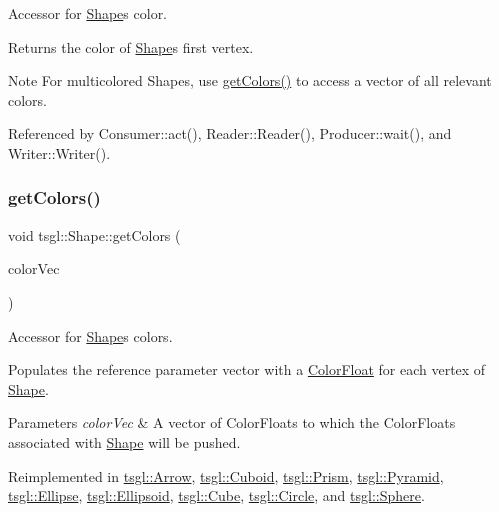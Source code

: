 Accessor for \hyperlink{classtsgl_1_1_shape}{Shape}\textquotesingle{}s color. 

Returns the color of \hyperlink{classtsgl_1_1_shape}{Shape}\textquotesingle{}s first vertex. \begin{DoxyNote}{Note}
For multicolored Shapes, use \hyperlink{classtsgl_1_1_shape_a6f54fe4d049f69a287edf8335a9509f8}{get\+Colors()} to access a vector of all relevant colors. 
\end{DoxyNote}


Referenced by Consumer\+::act(), Reader\+::\+Reader(), Producer\+::wait(), and Writer\+::\+Writer().

\mbox{\label{classtsgl_1_1_shape_a6f54fe4d049f69a287edf8335a9509f8}} 
\subsubsection{\texorpdfstring{get\+Colors()}{getColors()}}
{\footnotesize\ttfamily void tsgl\+::\+Shape\+::get\+Colors (\begin{DoxyParamCaption}\item[{std\+::vector$<$ \hyperlink{structtsgl_1_1_color_float}{Color\+Float} $>$ \&}]{color\+Vec }\end{DoxyParamCaption})\hspace{0.3cm}{\ttfamily [virtual]}}



Accessor for \hyperlink{classtsgl_1_1_shape}{Shape}\textquotesingle{}s colors. 

Populates the reference parameter vector with a \hyperlink{structtsgl_1_1_color_float}{Color\+Float} for each vertex of \hyperlink{classtsgl_1_1_shape}{Shape}. 
\begin{DoxyParams}{Parameters}
{\em color\+Vec} & A vector of Color\+Floats to which the Color\+Floats associated with \hyperlink{classtsgl_1_1_shape}{Shape} will be pushed. \\
\hline
\end{DoxyParams}


Reimplemented in \hyperlink{classtsgl_1_1_arrow_a45f13b066c85baae9712730787f49fac}{tsgl\+::\+Arrow}, \hyperlink{classtsgl_1_1_cuboid_ac3e7d161cb2dbb02cf000e92d84e10ba}{tsgl\+::\+Cuboid}, \hyperlink{classtsgl_1_1_prism_abfdc091d8c61e889f61b71577b58e0b6}{tsgl\+::\+Prism}, \hyperlink{classtsgl_1_1_pyramid_a9c93002e90ac1f3385c4d3154ca0321a}{tsgl\+::\+Pyramid}, \hyperlink{classtsgl_1_1_ellipse_a3d92da146589fc58112945daefafe98f}{tsgl\+::\+Ellipse}, \hyperlink{classtsgl_1_1_ellipsoid_ac5c9278659df646c17ef4172e13c7cb3}{tsgl\+::\+Ellipsoid}, \hyperlink{classtsgl_1_1_cube_ac1d31d18439024e4160db369df463a7d}{tsgl\+::\+Cube}, \hyperlink{classtsgl_1_1_circle_af0e1ef7313bde5f66750b616de296f76}{tsgl\+::\+Circle}, and \hyperlink{classtsgl_1_1_sphere_a767bfb1b0c6c29d0577377aa0403d881}{tsgl\+::\+Sphere}.


